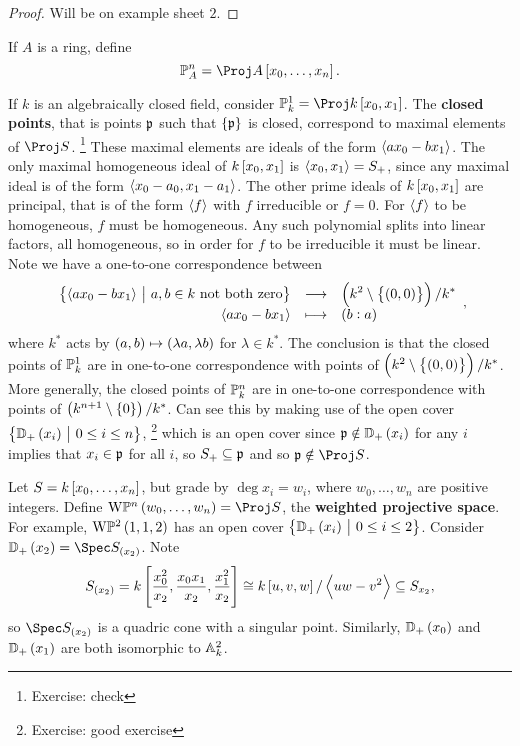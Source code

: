 \begin{proof}
Will be on example sheet $ 2 $.
\end{proof}

\begin{definition*}
If $ A $ is a ring, define
$$ \PP_A^n = \Proj A\sbr{x_0, \dots, x_n}. $$
\end{definition*}

\begin{example*}
If $ k $ is an algebraically closed field, consider $ \PP_k^1 = \Proj k\sbr{x_0, x_1} $. The \textbf{closed points}, that is points $ \ppp $ such that $ \cbr{\ppp} $ is closed, correspond to maximal elements of $ \Proj S $. \footnote{Exercise: check} These maximal elements are ideals of the form $ \abr{ax_0 - bx_1} $. The only maximal homogeneous ideal of $ k\sbr{x_0, x_1} $ is $ \abr{x_0, x_1} = S_+ $, since any maximal ideal is of the form $ \abr{x_0 - a_0, x_1 - a_1} $. The other prime ideals of $ k\sbr{x_0, x_1} $ are principal, that is of the form $ \abr{f} $ with $ f $ irreducible or $ f = 0 $. For $ \abr{f} $ to be homogeneous, $ f $ must be homogeneous. Any such polynomial splits into linear factors, all homogeneous, so in order for $ f $ to be irreducible it must be linear. Note we have a one-to-one correspondence between
$$ \function{\cbr{\abr{ax_0 - bx_1} \st a, b \in k \ \text{not both zero}}}{\br{k^2 \setminus \cbr{\br{0, 0}}} / k^*}{\abr{ax_0 - bx_1}}{\br{b : a}}, $$
where $ k^* $ acts by $ \br{a, b} \mapsto \br{\lambda a, \lambda b} $ for $ \lambda \in k^* $. The conclusion is that the closed points of $ \PP_k^1 $ are in one-to-one correspondence with points of $ \br{k^2 \setminus \cbr{\br{0, 0}}} / k^* $. More generally, the closed points of $ \PP_k^n $ are in one-to-one correspondence with points of $ \br{k^{n + 1} \setminus \cbr{0}} / k^* $. Can see this by making use of the open cover $ \cbr{\DD_+\br{x_i} \st 0 \le i \le n} $, \footnote{Exercise: good exercise} which is an open cover since $ \ppp \notin \DD_+\br{x_i} $ for any $ i $ implies that $ x_i \in \ppp $ for all $ i $, so $ S_+ \subseteq \ppp $ and so $ \ppp \notin \Proj S $.
\end{example*}

\begin{example*}
Let $ S = k\sbr{x_0, \dots, x_n} $, but grade by $ \deg x_i = w_i $, where $ w_0, \dots, w_n $ are positive integers. Define $ \W\PP^n\br{w_0, \dots, w_n} = \Proj S $, the \textbf{weighted projective space}. For example, $ \W\PP^2\br{1, 1, 2} $ has an open cover $ \cbr{\DD_+\br{x_i} \st 0 \le i \le 2} $. Consider $ \DD_+\br{x_2} = \Spec S_{\br{x_2}} $. Note
$$ S_{\br{x_2}} = k\sbr{\dfrac{x_0^2}{x_2}, \dfrac{x_0x_1}{x_2}, \dfrac{x_1^2}{x_2}} \cong k\sbr{u, v, w} / \abr{uw - v^2} \subseteq S_{x_2}, $$
so $ \Spec S_{\br{x_2}} $ is a quadric cone with a singular point. Similarly, $ \DD_+\br{x_0} $ and $ \DD_+\br{x_1} $ are both isomorphic to $ \AA_k^2 $.
\end{example*}

